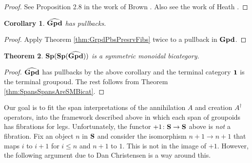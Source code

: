 \documentclass[11pt]{amsart}
\newtheorem{thm}{Theorem}[section]
\newtheorem{cor}[thm]{Corollary}
\theoremstyle{remark}
\theoremstyle{definition}
\begin{document}
\begin{proof}
See Proposition 2.8 in the work of Brown 
	\cite{Brown}. 
Also see the work of Heath 
	\cite{Heath}.
\end{proof}

\begin{cor}
	$\bold{\widehat{Gpd}}$ has pullbacks.
\end{cor}

\begin{proof}
	Apply Theorem \ref{thm:GrpdPbsPresrvFibs} 
	twice to a pullback in $\bold{Gpd}$.
\end{proof}

\begin{thm}
	$\bold{Sp(Sp(\widehat{Gpd}))}$ is a 
	symmetric monoidal bicategory.
\end{thm}

\begin{proof}
	$\bold{\widehat{Gpd}}$ has pullbacks 
	by the above corollary and 
	the terminal category $\bold{1}$ 
	is the terminal groupoud.  
	The rest follows from Theorem \ref{thm:SpansSpansAreSMBicat}.
\end{proof}

Our goal is to fit the span interpretations 
of the annihilation $A$ and 
creation $A^\dagger$ operators, 
into the framework described above 
in which each span of groupoids 
has fibrations for legs. 
Unfortunately, the functor 
	$+1 \colon \bold{S} \to \bold{S}$ 
above is \emph{not} a fibration. 
Fix an object $n$ in $\bold{S}$ and 
consider the isomorphism 
	$n+1 \to n+1$ 
that maps $i$ to $i+1$ for $i \leq n$ and $n+1$ to $1$. 
This is not in the image of $+1$.
However, the following argument 
due to Dan Christensen \cite{DC} 
is a way around this.
\end{document}
